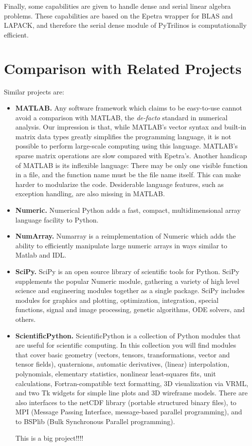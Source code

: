 \documentclass[10pt,relax]{SANDreport}
\begin{document}
Finally, some
capabilities are given to handle dense and serial linear algebra problems.
These capabilities are based on the Epetra wrapper for BLAS and LAPACK, and
therefore the serial dense module of PyTrilinos is computationally efficient.

\section{Comparison with Related Projects}
\label{sec:related}

Similar projects are:
\begin{itemize}
\item {\bf MATLAB.} Any software framework which claims to be easy-to-use
cannot avoid a comparison with MATLAB, the {\sl de-facto} standard in
numerical analysis. Our impression is that, while MATLAB's vector syntax and
built-in matrix data types greatly simplifies the programming language, it is
not possible to perform large-scale computing using this language. MATLAB's
sparse matrix operations are slow compared with Epetra's. Another handicap of
MATLAB is its inflexible language: There may be only one visible function in a
file, and the function name must be the file name itself. This can make harder
to modularize the code. Desiderable language features, such as exception
handling, are also missing in MATLAB.


\item {\bf Numeric.} Numerical Python adds a fast, compact, multidimensional array language facility to Python.
\item  {\bf NumArray.} 
Numarray is a reimplementation of Numeric which adds the ability to
efficiently manipulate large numeric arrays in ways similar to Matlab and IDL.
\item {\bf SciPy.} SciPy is an open source library of scientific tools for
Python. SciPy supplements the popular Numeric module, gathering a variety of
high level science and engineering modules together as a single package. SciPy
includes modules for graphics and plotting, optimization, integration, special
functions, signal and image processing, genetic algorithms, ODE solvers, and
others.
\item {\bf ScientificPython.} 
ScientificPython is a collection of Python modules that are useful for
scientific computing. In this collection you will find modules that cover
basic geometry (vectors, tensors, transformations, vector and tensor fields),
  quaternions, automatic derivatives, (linear) interpolation, polynomials,
  elementary statistics, nonlinear least-squares fits, unit calculations,
  Fortran-compatible text formatting, 3D visualization via VRML, and two Tk
  widgets for simple line plots and 3D wireframe models. There are also
  interfaces to the netCDF library (portable structured binary files), to MPI
  (Message Passing Interface, message-based parallel programming), and to
  BSPlib (Bulk Synchronous Parallel programming).

  This is a big project!!!!
\end{itemize}
\end{document}
